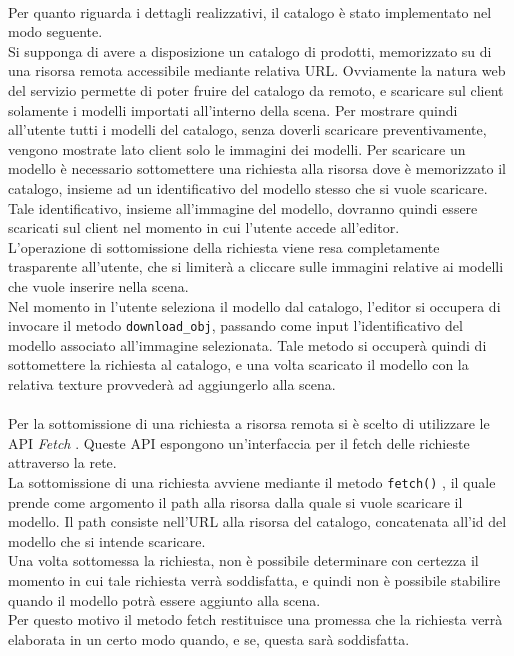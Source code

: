 \\
Per quanto riguarda i dettagli realizzativi, il catalogo è stato implementato nel modo seguente.
\\
Si supponga di avere a disposizione un catalogo di prodotti, memorizzato su di una risorsa remota accessibile mediante relativa URL. Ovviamente la natura web del servizio permette di poter fruire del catalogo da remoto, e scaricare sul client solamente i modelli importati all’interno della scena. Per mostrare quindi all’utente tutti i modelli del catalogo, senza doverli scaricare preventivamente, vengono mostrate lato client solo le immagini dei modelli.
Per scaricare un modello è necessario sottomettere una richiesta alla risorsa dove è memorizzato il catalogo, insieme ad un identificativo del modello stesso che si vuole scaricare. Tale identificativo, insieme all’immagine del modello, dovranno quindi essere scaricati sul client nel momento in cui l’utente accede all’editor.
\\
L’operazione di sottomissione della richiesta viene resa completamente trasparente all’utente, che si limiterà a cliccare sulle immagini relative ai modelli che vuole inserire nella scena.
\\ 
Nel momento in l’utente seleziona il modello dal catalogo, l’editor si occupera di invocare il metodo \texttt{download\_obj}, passando come input l’identificativo del modello associato all’immagine selezionata. Tale metodo si occuperà quindi di sottomettere la richiesta al catalogo, e una volta scaricato il modello con la relativa texture provvederà ad aggiungerlo alla scena. 
\\
\\
Per la sottomissione di una richiesta a risorsa remota si è scelto di utilizzare le API \emph{Fetch} . Queste API espongono un’interfaccia per il fetch delle richieste attraverso la rete.
\\ 
La sottomissione di una richiesta avviene mediante il metodo \texttt{fetch()} , il quale prende come argomento il path alla risorsa dalla quale si vuole scaricare il modello. Il path consiste nell’URL alla risorsa del catalogo, concatenata all’id del modello che si intende scaricare.
\\
Una volta sottomessa la richiesta, non è possibile determinare con certezza il momento in cui tale richiesta verrà soddisfatta, e quindi non è possibile stabilire quando il modello potrà essere aggiunto alla scena.
\\
Per questo motivo il metodo fetch restituisce una promessa che la richiesta verrà elaborata in un certo modo quando, e se, questa sarà soddisfatta.

